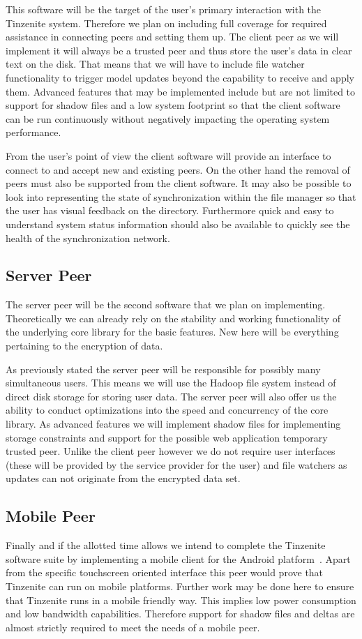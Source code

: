 This software will be the target of the user's primary interaction with the Tinzenite system.
Therefore we plan on including full coverage for required assistance in connecting peers and setting them up.
The client peer as we will implement it will always be a trusted peer and thus store the user's data in clear text on the disk.
That means that we will have to include file watcher functionality to trigger model updates beyond the capability to receive and apply them.
Advanced features that may be implemented include but are not limited to support for shadow files and a low system footprint so that the client software can be run continuously without negatively impacting the operating system performance.

From the user's point of view the client software will provide an interface to connect to and accept new and existing peers.
On the other hand the removal of peers must also be supported from the client software.
It may also be possible to look into representing the state of synchronization within the file manager so that the user has visual feedback on the directory.
Furthermore quick and easy to understand system status information should also be available to quickly see the health of the synchronization network.

\subsection{Server Peer}

The server peer will be the second software that we plan on implementing.
Theoretically we can already rely on the stability and working functionality of the underlying core library for the basic features.
New here will be everything pertaining to the encryption of data.

As previously stated the server peer will be responsible for possibly many simultaneous users.
This means we will use the Hadoop file system instead of direct disk storage for storing user data.
The server peer will also offer us the ability to conduct optimizations into the speed and concurrency of the core library.
As advanced features we will implement shadow files for implementing storage constraints and support for the possible web application temporary trusted peer.
Unlike the client peer however we do not require user interfaces (these will be provided by the service provider for the user) and file watchers as updates can not originate from the encrypted data set.

\subsection{Mobile Peer}

Finally and if the allotted time allows we intend to complete the Tinzenite software suite by implementing a mobile client for the Android platform~\cite{web:site:android}.
Apart from the specific touchscreen oriented interface this peer would prove that Tinzenite can run on mobile platforms.
Further work may be done here to ensure that Tinzenite runs in a mobile friendly way.
This implies low power consumption and low bandwidth capabilities.
Therefore support for shadow files and deltas are almost strictly required to meet the needs of a mobile peer.
